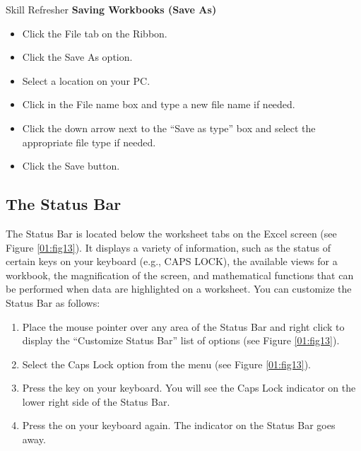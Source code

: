 \begin{center}
	\begin{sklbox}{Skill Refresher}
		\textbf{Saving Workbooks (Save As)}
		\\
		\begin{itemize}
			\setlength{\itemsep}{0pt}
			\setlength{\parskip}{0pt}
			\setlength{\parsep}{0pt}
			
			\item Click the File tab on the Ribbon.
			\item Click the Save As option.
			\item Select a location on your PC.
			\item Click in the File name box and type a new file name if needed.
			\item Click the down arrow next to the ``Save as type'' box and select the appropriate file type if needed.
			\item Click the Save button.
		
		\end{itemize}
	\end{sklbox}
\end{center}

\subsection{The Status Bar}

The Status Bar is located below the worksheet tabs on the Excel screen (see Figure \ref{01:fig13}). It displays a variety of information, such as the status of certain keys on your keyboard (e.g., CAPS LOCK), the available views for a workbook, the magnification of the screen, and mathematical functions that can be performed when data are highlighted on a worksheet. You can customize the Status Bar as follows:

\begin{enumerate}
	\item Place the mouse pointer over any area of the Status Bar and right click to display the ``Customize Status Bar'' list of options (see Figure \ref{01:fig13}).
	\item Select the Caps Lock option from the menu (see Figure \ref{01:fig13}).
	\item Press the  key on your keyboard. You will see the Caps Lock indicator on the lower right side of the Status Bar.
	\item Press the  on your keyboard again. The indicator on the Status Bar goes away.
\end{enumerate}

